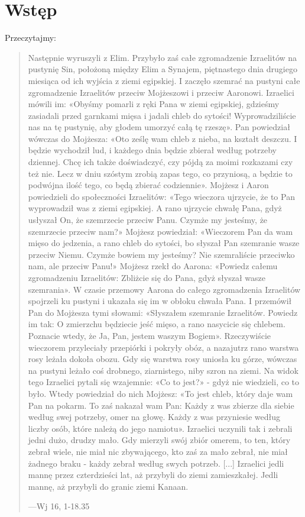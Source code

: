 \documentclass[a5paper,10pt,polish]{book}
\begin{document}
\section{Wstęp}
\label{babice2006-jesien-knurow/spotkanie2:wstep}
Przeczytajmy:
\begin{quote}

Następnie wyruszyli z Elim. Przybyło zaś całe zgromadzenie Izraelitów na pustynię Sin, położoną między Elim a Synajem, piętnastego dnia drugiego miesiąca od ich wyjścia z ziemi egipskiej. I zaczęło szemrać na pustyni całe zgromadzenie Izraelitów przeciw Mojżeszowi i przeciw Aaronowi. Izraelici mówili im: «Obyśmy pomarli z ręki Pana w ziemi egipskiej, gdzieśmy zasiadali przed garnkami mięsa i jadali chleb do sytości! Wyprowadziliście nas na tę pustynię, aby głodem umorzyć całą tę rzeszę». Pan powiedział wówczas do Mojżesza: «Oto ześlę wam chleb z nieba, na kształt deszczu. I będzie wychodził lud, i każdego dnia będzie zbierał według potrzeby dziennej. Chcę ich także doświadczyć, czy pójdą za moimi rozkazami czy też nie. Lecz w dniu szóstym zrobią zapas tego, co przyniosą, a będzie to podwójna ilość tego, co będą zbierać codziennie». Mojżesz i Aaron powiedzieli do społeczności Izraelitów: «Tego wieczora ujrzycie, że to Pan wyprowadził was z ziemi egipskiej. A rano ujrzycie chwałę Pana, gdyż usłyszał On, że szemrzecie przeciw Panu. Czymże my jesteśmy, że szemrzecie przeciw nam?» Mojżesz powiedział: «Wieczorem Pan da wam mięso do jedzenia, a rano chleb do sytości, bo słyszał Pan szemranie wasze przeciw Niemu. Czymże bowiem my jesteśmy? Nie szemraliście przeciwko nam, ale przeciw Panu!» Mojżesz rzekł do Aarona: «Powiedz całemu zgromadzeniu Izraelitów: Zbliżcie się do Pana, gdyż słyszał wasze szemrania». W czasie przemowy Aarona do całego zgromadzenia Izraelitów spojrzeli ku pustyni i ukazała się im w obłoku chwała Pana. I przemówił Pan do Mojżesza tymi słowami: «Słyszałem szemranie Izraelitów. Powiedz im tak: O zmierzchu będziecie jeść mięso, a rano nasycicie się chlebem. Poznacie wtedy, że Ja, Pan, jestem waszym Bogiem». Rzeczywiście wieczorem przyleciały przepiórki i pokryły obóz, a nazajutrz rano warstwa rosy leżała dokoła obozu. Gdy się warstwa rosy uniosła ku górze, wówczas na pustyni leżało coś drobnego, ziarnistego, niby szron na ziemi. Na widok tego Izraelici pytali się wzajemnie: «Co to jest?» - gdyż nie wiedzieli, co to było. Wtedy powiedział do nich Mojżesz: «To jest chleb, który daje wam Pan na pokarm.  To zaś nakazał wam Pan: Każdy z was zbierze dla siebie według swej potrzeby, omer na głowę. Każdy z was przyniesie według liczby osób, które należą do jego namiotu». Izraelici uczynili tak i zebrali jedni dużo, drudzy mało. Gdy mierzyli swój zbiór omerem, to ten, który zebrał wiele, nie miał nic zbywającego, kto zaś za mało zebrał, nie miał żadnego braku - każdy zebrał według swych potrzeb. {[}...{]} Izraelici jedli mannę przez czterdzieści lat, aż przybyli do ziemi zamieszkałej. Jedli mannę, aż przybyli do granic ziemi Kanaan.

\begin{flushright}
---Wj 16, 1-18.35
\end{flushright}
\end{quote}
\end{document}
